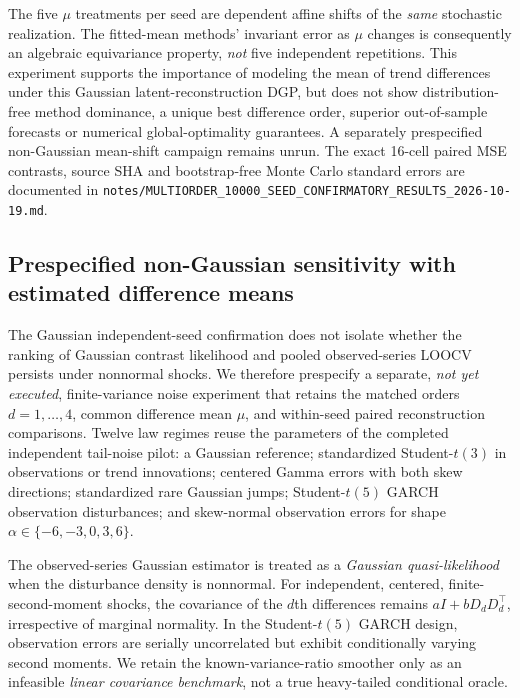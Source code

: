 \documentclass[11pt]{article}
\begin{document}
The five $\mu$ treatments per seed are
dependent affine shifts of the \emph{same}
stochastic realization. The fitted-mean
methods' invariant error as $\mu$ changes
is consequently an algebraic
equivariance property, \emph{not}
five independent repetitions.
This experiment supports the
importance of modeling the mean of
trend differences under this Gaussian
latent-reconstruction DGP, but does
not show distribution-free method
dominance, a unique best difference
order, superior out-of-sample forecasts
or numerical global-optimality guarantees.
A separately prespecified non-Gaussian
mean-shift campaign remains unrun.
The exact 16-cell paired MSE contrasts,
source SHA and bootstrap-free Monte Carlo
standard errors are documented in
\texttt{notes/MULTIORDER\_10000\_SEED\_CONFIRMATORY\_RESULTS\_2026-10-19.md}.

\subsection{Prespecified non-Gaussian sensitivity with estimated difference means}

The Gaussian independent-seed confirmation does not isolate
whether the ranking of Gaussian contrast likelihood and
pooled observed-series LOOCV persists under nonnormal shocks.
We therefore prespecify a separate, \emph{not yet executed},
finite-variance noise experiment that retains the matched
orders $d=1,\ldots,4$, common difference mean $\mu$, and
within-seed paired reconstruction comparisons. Twelve law
regimes reuse the parameters of the completed independent
tail-noise pilot: a Gaussian reference; standardized
Student-$t(3)$ in observations or trend innovations; centered
Gamma errors with both skew directions; standardized
rare Gaussian jumps; Student-$t(5)$ GARCH observation
disturbances; and skew-normal observation errors for
shape $\alpha\in\{-6,-3,0,3,6\}$.

The observed-series Gaussian estimator is treated as a
\emph{Gaussian quasi-likelihood} when the disturbance
density is nonnormal. For independent, centered,
finite-second-moment shocks, the covariance of the
$d$th differences remains
$aI+bD_dD_d^\top$, irrespective of marginal normality.
In the Student-$t(5)$ GARCH design, observation
errors are serially uncorrelated but exhibit
conditionally varying second moments. We retain
the known-variance-ratio smoother only as an
infeasible \emph{linear covariance benchmark},
not a true heavy-tailed conditional oracle.
\end{document}
